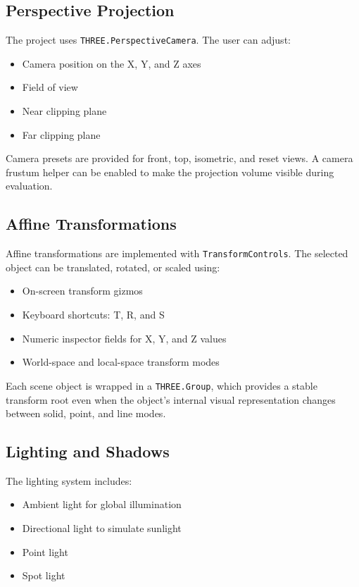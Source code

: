 \documentclass[12pt,a4paper]{article}
\begin{document}
\subsection{Perspective Projection}

The project uses \texttt{THREE.PerspectiveCamera}. The user can adjust:
\begin{itemize}
  \item Camera position on the X, Y, and Z axes
  \item Field of view
  \item Near clipping plane
  \item Far clipping plane
\end{itemize}

Camera presets are provided for front, top, isometric, and reset views. A camera
frustum helper can be enabled to make the projection volume visible during
evaluation.

\subsection{Affine Transformations}

Affine transformations are implemented with \texttt{TransformControls}. The
selected object can be translated, rotated, or scaled using:
\begin{itemize}
  \item On-screen transform gizmos
  \item Keyboard shortcuts: T, R, and S
  \item Numeric inspector fields for X, Y, and Z values
  \item World-space and local-space transform modes
\end{itemize}

Each scene object is wrapped in a \texttt{THREE.Group}, which provides a stable
transform root even when the object's internal visual representation changes
between solid, point, and line modes.

\subsection{Lighting and Shadows}

The lighting system includes:
\begin{itemize}
  \item Ambient light for global illumination
  \item Directional light to simulate sunlight
  \item Point light
  \item Spot light
\end{itemize}
\end{document}
